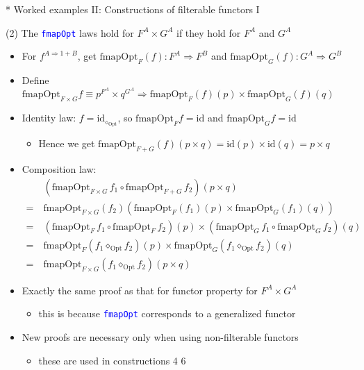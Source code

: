 \documentclass[english]{beamer}
\begin{document}
\begin{frame}{{*} Worked examples II: Constructions of filterable functors I}

(2) The \texttt{\textcolor{blue}{\footnotesize{}fmapOpt}} laws hold
for $F^{A}\times G^{A}$ if they hold for $F^{A}$ and $G^{A}$
\begin{itemize}
\item For $f^{A\Rightarrow1+B}$, get {\footnotesize{}$\text{fmapOpt}_{F}(f):F^{A}\Rightarrow F^{B}$
}and {\footnotesize{}$\text{fmapOpt}_{G}(f):G^{A}\Rightarrow G^{B}$}{\footnotesize \par}
\item Define {\footnotesize{}$\text{fmapOpt}_{F\times G}f\equiv p^{F^{A}}\times q^{G^{A}}\Rightarrow\text{fmapOpt}_{F}(f)(p)\times\text{fmapOpt}_{G}(f)(q)$}{\footnotesize \par}
\item Identity law: $f=\text{id}_{\diamond_{\text{Opt}}}$, so {\footnotesize{}$\text{fmapOpt}_{F}f=\text{id}$}
and {\footnotesize{}$\text{fmapOpt}_{G}f=\text{id}$}{\footnotesize \par}
\begin{itemize}
\item Hence we get $\text{fmapOpt}_{F+G}(f)(p\times q)=\text{id}(p)\times\text{id}(q)=p\times q$
\end{itemize}
\item Composition law:{\footnotesize{}
\begin{align*}
 & (\text{fmapOpt}_{F\times G}\,f_{1}\circ\text{fmapOpt}_{F+G}\,f_{2})(p\times q)\\
=\  & \text{fmapOpt}_{F\times G}(f_{2})\left(\text{fmapOpt}_{F}(f_{1})(p)\times\text{fmapOpt}_{G}(f_{1})(q)\right)\\
=\  & (\text{fmapOpt}_{F}\,f_{1}\circ\text{fmapOpt}_{F}\,f_{2})(p)\times\left(\text{fmapOpt}_{G}\,f_{1}\circ\text{fmapOpt}_{G}\,f_{2}\right)(q)\\
=\  & \text{fmapOpt}_{F}(f_{1}\diamond_{\text{Opt}}f_{2})(p)\times\text{fmapOpt}_{G}(f_{1}\diamond_{\text{Opt}}f_{2})(q)\\
=\  & \text{fmapOpt}_{F\times G}(f_{1}\diamond_{\text{Opt}}f_{2})(p\times q)
\end{align*}
}{\footnotesize \par}
\item Exactly the same proof as that for functor property for $F^{A}\times G^{A}$
\begin{itemize}
\item this is because \texttt{\textcolor{blue}{\footnotesize{}fmapOpt}}
corresponds to a generalized functor
\end{itemize}
\item New proofs are necessary only when using non-filterable functors
\begin{itemize}
\item these are used in constructions 4 \textendash{} 6
\end{itemize}
\end{itemize}
\end{frame}
\end{document}
